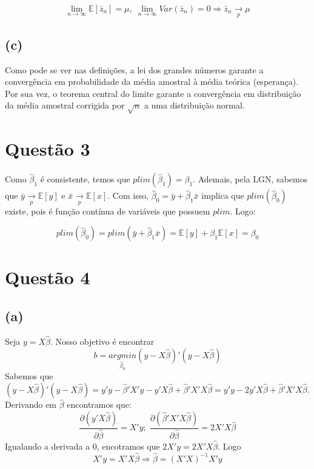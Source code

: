 \documentclass[12pt]{article}
\begin{document}
\begin{equation*}
\lim_{n \rightarrow \infty} \mathbb{E}[\bar{z}_{n}]= \mu ,\; 
\lim_{n \rightarrow \infty} Var(\bar{z}_{n})=0 \Longrightarrow
\bar{z}_{n} \xrightarrow[p]{} \mu 
\end{equation*}

\subsection*{(c)}
Como pode se ver nas definições, a lei dos grandes números garante a convergência em probabilidade da média amostral à média teórica (esperança). Por sua vez, o teorema central do limite garante a convergência em distribuição da média amostral corrigida por $\sqrt{n}$ a uma distribuição normal.

\section*{Questão 3}
Como $\hat{\beta}_{1}$ é consistente, temos que $plim(\hat{\beta}_{1})=\beta_{1}$. Ademais, pela LGN, sabemos que $\bar{y}\xrightarrow[p]{}\mathbb{E}[y]$ e $\bar{x}\xrightarrow[p]{}\mathbb{E}[x]$. Com isso, $\hat{\beta}_{0}=\bar{y}+\hat{\beta}_{1}\bar{x}$ implica que $plim(\hat{\beta}_{0})$ existe, pois é função contínua de variáveis que possuem $plim$. Logo:

\begin{equation*}
plim(\hat{\beta}_{0})=plim(\bar{y}+\hat{\beta}_{1}\bar{x})=\mathbb{E}[y]+\beta_{1}\mathbb{E}[x]=\beta_{0}
\end{equation*}

\section*{Questão 4}

\subsection*{(a)}
Seja $y=X\hat{\beta}$. Nosso objetivo é encontrar
\begin{equation*}
b=\underset{\hat{\beta}_{0}}{argmin}(y-X\hat{\beta})'(y-X\hat{\beta})
\end{equation*}
Sabemos que $(y-X\hat{\beta})'(y-X\hat{\beta})=y'y-\hat{\beta}'X'y-
y'X\hat{\beta}+\hat{\beta}'X'X\hat{\beta}=y'y-2y'X\hat{\beta}+\hat{\beta}'X'X\hat{\beta}$. Derivando em $\hat{\beta}$ encontramos que:
\begin{equation*}
\frac{\partial (y'X\hat{\beta})}{\partial\hat{\beta}}=X'y; \; 
\frac{\partial (\hat{\beta}'X'X\hat{\beta})}{\partial\hat{\beta}}=2X'X\hat{\beta}
\end{equation*}
Igualando a derivada a 0, encotramos que $2X'y=2X'X\hat{\beta}$. Logo
\begin{equation*}
X'y=X'X\hat{\beta} \Longrightarrow \hat{\beta}=(X'X)^{-1}X'y
\end{equation*}
 
\end{document}
